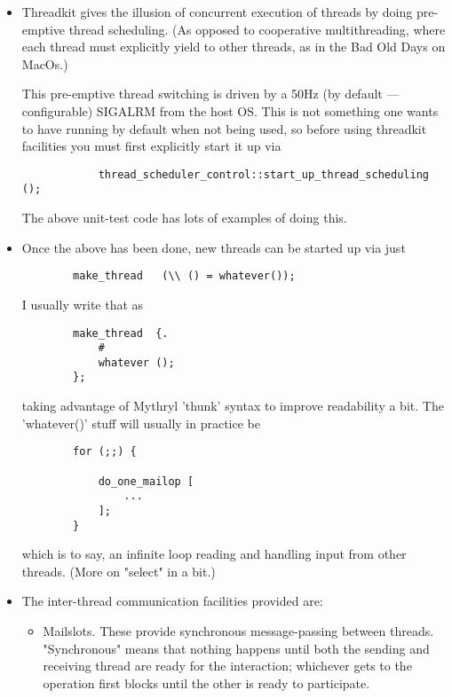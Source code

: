 \begin{itemize}
\item 
Threadkit gives the illusion of concurrent execution of threads by 
doing pre-emptive thread scheduling.  (As opposed to cooperative 
multithreading, where each thread must explicitly yield to other 
threads, as in the Bad Old Days on MacOs.) 

This pre-emptive thread switching is driven by 
a 50Hz (by default --- configurable) SIGALRM from 
the host OS.  This is not something one wants to have 
running by default when not being used, so before using 
threadkit facilities you must first explicitly start it up via 
\begin{verbatim}
            thread_scheduler_control::start_up_thread_scheduling ();
\end{verbatim}

The above unit-test code has lots of examples of doing this. 

\item 
Once the above has been done, new threads can be started 
up via just 

\begin{verbatim}
        make_thread   (\\ () = whatever());
\end{verbatim}

I usually write that as 

\begin{verbatim}
        make_thread  {.
            #
            whatever ();
        };
\end{verbatim}

taking advantage of Mythryl 'thunk' syntax to improve 
readability a bit.  The 'whatever()' stuff will usually 
in practice be

\begin{verbatim}
        for (;;) {

            do_one_mailop [
                ...
            ];
        }
\end{verbatim}

which is to say, an infinite loop reading and handling 
input from other threads.  (More on "select" in a bit.) 

\item The inter-thread communication facilities provided are:


\begin{itemize}
\item 
Mailslots.  These provide synchronous message-passing 
between threads.  "Synchronous" means that nothing 
happens until both the sending and receiving thread 
are ready for the interaction;  whichever gets to the 
operation first blocks until the other is ready to 
participate. 


\end{itemize}
\end{itemize}
